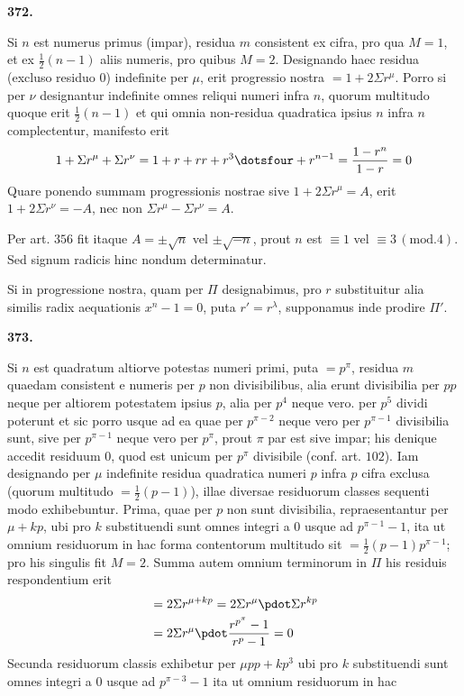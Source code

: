 \par\medskip{}\centerline{\textbf{372.}}\nobreak\smallskip
Si $n$ est numerus primus (impar), residua $m$ consistent ex cifra, pro qua $M=1$, et ex $\frac12(n-1)$ aliis numeris, pro quibus $M=2$. Designando haec residua (excluso residuo $0$) indefinite per $\mu$, erit progressio nostra $=1+2\Sigma r^\mu$. Porro si per $\nu$ designantur indefinite omnes reliqui numeri infra $n$, quorum multitudo quoque erit $\frac12(n-1)$ et qui omnia non-residua quadratica ipsius $n$ infra $n$ complectentur, manifesto erit
\[
1+\Sigma r^\mu+\Sigma r^\nu=1+r+rr+r^3\dotsfour+r^{n-1}=\frac{1-r^n}{1-r}=0
\]
Quare ponendo summam progressionis nostrae sive $1+2\Sigma r^\mu=A$, erit $1+2\Sigma r^\nu=-A$, nec non $\Sigma r^\mu-\Sigma r^\nu=A$.
\par Per art. $356$ fit itaque $A=\pm\surd n$ vel $\pm\surd{-n}$, prout $n$ est $\equiv1$ vel $\equiv3\, (\mathrm{mod}.4)$. Sed signum radicis hinc nondum determinatur.
\par Si in progressione nostra, quam per $\Pi$ designabimus, pro $r$ substituitur alia similis radix aequationis $x^n-1=0$, puta $r'=r^\lambda$, supponamus inde prodire $\Pi'$.
\par\medskip{}\centerline{\textbf{373.}}\nobreak\smallskip
Si $n$ est quadratum altiorve potestas numeri primi, puta $=p^\pi$, residua $m$ quaedam consistent e numeris per $p$ non divisibilibus, alia erunt divisibilia per $pp$ neque per altiorem potestatem ipsius $p$, alia per $p^4$ neque vero. per $p^5$ dividi poterunt et sic porro usque ad ea quae per $p^{\pi-2}$ neque vero per $p^{\pi-1}$ divisibilia sunt, sive per $p^{\pi-1}$ neque vero per $p^\pi$, prout $\pi$ par est sive impar; his denique accedit residuum $0$, quod est unicum per $p^\pi$ divisibile (conf. art. $102$). Iam designando per $\mu$ indefinite residua quadratica numeri $p$ infra $p$ cifra exclusa (quorum multitudo $=\frac12(p-1)$), illae diversae residuorum classes sequenti modo exhibebuntur. Prima, quae per $p$ non sunt divisibilia, repraesentantur per $\mu+kp$, ubi pro $k$ substituendi sunt omnes integri a $0$ usque ad $p^{\pi-1}-1$, ita ut omnium residuorum in hac forma contentorum multitudo sit $=\frac12(p-1)p^{\pi-1}$; pro his singulis fit $M=2$. Summa autem omnium terminorum in $\Pi$ his residuis respondentium erit
\[
\begin{aligned}
&=2\Sigma r^{\mu+kp}=2\Sigma r^\mu\pdot\Sigma r^{kp}\\
&=2\Sigma r^\mu\pdot\frac{r^{p^\pi}-1}{r^p-1}=0
\end{aligned}
\]
Secunda residuorum classis exhibetur per $\mu pp+kp^3$ ubi pro $k$ substituendi sunt omnes integri a $0$ usque ad $p^{\pi-3}-1$ ita ut omnium residuorum in hac
